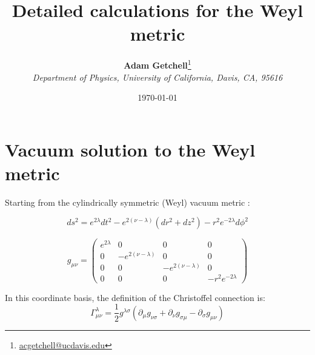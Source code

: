 \documentclass{article}
\title{Detailed calculations for the Weyl metric}
\author{\textbf{Adam Getchell}\footnote{\href{mailto:acgetchell@ucdavis.edu}{acgetchell@ucdavis.edu}}\\\textit{Department of Physics, University of California, Davis, CA, 95616}}
\date{\today}
\begin{document}
\maketitle
\tableofcontents

\section{Vacuum solution to the Weyl metric}

Starting from the cylindrically symmetric (Weyl) vacuum metric \cite{synge_relativity}:

\begin{equation}
	ds^{2}=e^{2\lambda}dt^{2}-e^{2\left(\nu-\lambda\right)}\left(dr^{2}+dz^{2}\right)-r^{2}e^{-2\lambda}d\phi^{2}
	\label{eq:weyl-vacuum-metric}
\end{equation}

\begin{equation}
g_{\mu\nu}=\left(\begin{array}{cccc}
e^{2\lambda} & 0 & 0 & 0\\
0 & -e^{2\left(\nu-\lambda\right)} & 0 & 0\\
0 & 0 & -e^{2\left(\nu-\lambda\right)} & 0\\
0 & 0 & 0 & -r^{2}e^{-2\lambda}
\end{array}\right)\label{eq:general-axisymmetric-static-matrix-metric}
\end{equation}

In this coordinate basis, the definition of the Christoffel connection is: \cite{carroll2003spacetime} 
\begin{equation}
\Gamma_{\mu\nu}^{\lambda}=\frac{1}{2}g^{\lambda\sigma}\left(\partial_{\mu}g_{\nu\sigma}+\partial_{\nu}g_{\sigma\mu}-\partial_{\sigma}g_{\mu\nu}\right)
\end{equation}
\end{document}
